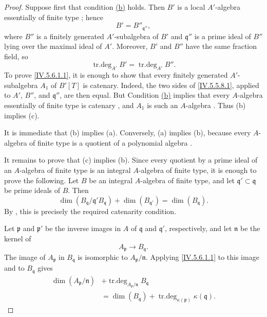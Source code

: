 \begin{proof}
Suppose first that condition
{\hyperref[IV.5.6.1.b]{\textup{(b)}}} holds.  Then $B'$ is a local
$A'$-algebra essentially of finite type ; hence
\[
B'=B''_{\mathfrak q''},
\]
where $B''$ is a finitely generated $A'$-subalgebra of $B'$ and
$\mathfrak q''$ is a prime ideal of $B''$ lying over the maximal
ideal of $A'$.  Moreover, $B'$ and $B''$ have the same fraction
field, so
\[
\operatorname{tr.deg}_{A'}B'
 =\operatorname{tr.deg}_{A'}B''.
\]
To prove \eqref{IV.5.6.1.1}, it is enough to show that every
finitely generated $A'$-subalgebra $A_1$ of $B'[T]$ is catenary.
Indeed, the two sides of \eqref{IV.5.5.8.1}, applied to $A'$, $B''$,
and $\mathfrak q''$, are then equal.  But
Condition {\hyperref[IV.5.6.1.b]{\textup{(b)}}} implies that every
$A$-algebra essentially of
finite type is catenary , and $A_1$ is such an
$A$-algebra .  Thus (b) implies (c).

It is immediate that (b) implies (a).  Conversely, (a) implies (b),
because every $A$-algebra of finite type is a quotient of a
polynomial algebra .

It remains to prove that (c) implies (b).  Since every quotient by a
prime ideal of an $A$-algebra of finite type is an integral
$A$-algebra of finite type, it is enough to prove the following.
Let $B$ be an integral $A$-algebra of finite type, and let
$\mathfrak q'\subset\mathfrak q$ be prime ideals of $B$.  Then
\begin{equation}
\dim(B_{\mathfrak q}/\mathfrak q'B_{\mathfrak q})
 +\dim(B_{\mathfrak q'})
 =\dim(B_{\mathfrak q}).
\tag{5.6.1.2}\label{IV.5.6.1.2}
\end{equation}
By , this is precisely the required catenarity
condition.


Let $\mathfrak p$ and $\mathfrak p'$ be the inverse images in $A$ of
$\mathfrak q$ and $\mathfrak q'$, respectively, and let
$\mathfrak n$ be the kernel of
\[
A_{\mathfrak p}\longrightarrow B_{\mathfrak q}.
\]
The image of $A_{\mathfrak p}$ in $B_{\mathfrak q}$ is isomorphic to
$A_{\mathfrak p}/\mathfrak n$.  Applying
\eqref{IV.5.6.1.1} to this image and to $B_{\mathfrak q}$ gives
\begin{equation}
\begin{split}
\dim(A_{\mathfrak p}/\mathfrak n)
 &+\operatorname{tr.deg}_{A_{\mathfrak p}/\mathfrak n}
       B_{\mathfrak q}\\
 &=\dim(B_{\mathfrak q})
   +\operatorname{tr.deg}_{\kappa(\mathfrak p)}
       \kappa(\mathfrak q).
\end{split}
\tag{5.6.1.3}\label{IV.5.6.1.3}
\end{equation}


\end{proof}
